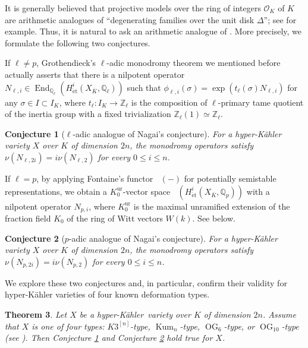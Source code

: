 \documentclass[12pt,reqno]{amsart}
\newtheorem{thm}{Theorem}[section]
\newtheorem{conj}[thm]{Conjecture}
\theoremstyle{definition}
\newcommand{\Q}{{\mathds Q}}
\newcommand{\Z}{{\mathds Z}}
\DeclareMathOperator{\Dpst}{\mathit{D}_{\mathrm{pst}}}
\newcommand\End{\mathop{\mathrm{End}}\nolimits}
\newcommand{\et}{\mathrm{\acute{e}t}}
\newcommand{\hk}{hyper-Kähler~}
\newcommand\Kum{\mathop{\mathrm{Kum}}\nolimits}
\newcommand\OG{\mathop{\mathrm{OG}}\nolimits}
\newcommand{\cO}{\mathcal{O}}
\DeclareMathOperator{\ur}{ur}
\numberwithin{equation}{section}
\begin{document}
It is generally believed that projective models over the ring of integers $\cO_K$ of $K$ are arithmetic analogues of ``degenerating families over the unit disk $\Delta$''; see \cite[Table 9.1]{DeligneHodgeI} for example. Thus, it is natural to ask an arithmetic analogue of . More precisely, we formulate the following two conjectures.

If $\ell \neq p$, Grothendieck's $\ell$-adic monodromy theorem we mentioned before actually asserts that there is a nilpotent operator $N_{\ell,i} \in \End_{\Q_{\ell}}(H^i_{\et}(X_{\overline{K}},\Q_{\ell}))$ such that
$\phi_{\ell,i}(\sigma) = \exp(t_{\ell}(\sigma)N_{\ell,i})$
for any $\sigma \in I \subset I_K$,
where $t_{\ell} \colon I_K \to \Z_{\ell}$ is the composition of $\ell$-primary tame quotient of the inertia group with a fixed trivialization $\Z_{\ell}(1) \simeq \Z_{\ell}$.
\begin{conj}[$\ell$-adic analogue of Nagai's conjecture]
\label{ell adic Nagai Conjecture}For a hyper-Kähler variety $X$ over $K$ of dimension $2n$, the monodromy operators satisfy
$
\nu(N_{\ell,2i}) =  i\nu(N_{\ell,2})
$
for every $0 \leq i \leq n$.
\end{conj}

If $\ell =p$, by applying Fontaine's functor $\Dpst(-)$ 
for potentially semistable representations,
we obtain a $K_0^{\ur}$-vector space 
$
\Dpst(H^i_{\et}(X_{\overline{K}},\Q_p))
$
with a nilpotent operator
$N_{p,i}$, where $K_0^{\ur}$ is the maximal unramified extension of the fraction field $K_0$ of the ring of Witt vectors $W(k)$.
See  below.

\begin{conj}[$p$-adic analogue of Nagai's conjecture]
\label{p adic Nagai Conjecture}
For a hyper-Kähler variety $X$ over $K$ of dimension $2n$, the monodromy operators satisfy 
$
\nu(N_{p, 2i}) =  i\nu(N_{p,2})
$
for every $0 \leq i \leq n$.
\end{conj}

We explore these two conjectures and, in particular, confirm their validity for hyper-Kähler varieties of four known deformation types.
\begin{thm}
\label{Main Theorem for known hk}
Let $X$ be a \hk variety over $K$ of dimension $2n$.
Assume that $X$ is one of four types: $K3^{[n]}$-type, $\Kum_n$-type, $\OG_6$-type, or $\OG_{10}$-type (see ).
Then Conjecture \ref{ell adic Nagai Conjecture}
and 
Conjecture \ref{p adic Nagai Conjecture}
hold true for $X$.
\end{thm}
\end{document}
